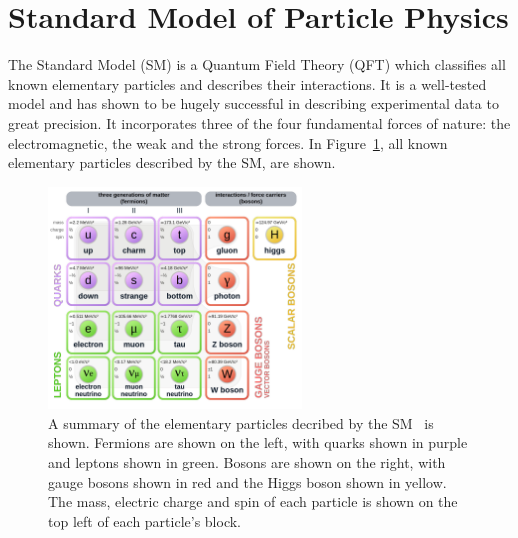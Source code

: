 \section{Standard Model of Particle Physics}
The Standard Model (SM) is a Quantum Field Theory (QFT) which classifies all known elementary particles and describes their interactions. It is a well-tested model and has shown to be hugely successful in describing experimental data to great precision. It incorporates three of the four fundamental forces of nature: the electromagnetic, the weak and the strong forces. In Figure~\ref{fig:SM-particles}, all known elementary particles described by the SM, are shown.

\begin{figure}[h!]
\includegraphics[width=0.6\textwidth]{figures/theoryFigs/SM_particles.png}
\centering
\caption{A summary of the elementary particles decribed by the SM~\cite{SM-picture} is shown. Fermions are shown on the left, with quarks shown in purple and leptons shown in green. Bosons are shown on the right, with gauge bosons shown in red and the Higgs boson shown in yellow. The mass, electric charge and spin of each particle is shown on the top left of each particle's block.}
\label{fig:SM-particles}
\end{figure}
\noindent
